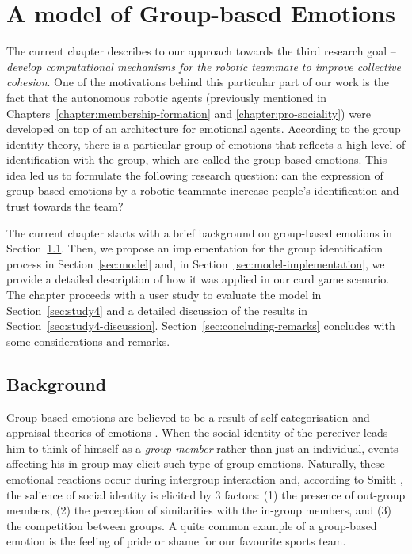 \chapter{A model of Group-based Emotions}
\label{chapter:group-based-emotions}


The current chapter describes to our approach towards the third research goal -- \textit{develop computational mechanisms for the robotic teammate to improve collective cohesion}. One of the motivations behind this particular part of our work is the fact that the autonomous robotic agents (previously mentioned in Chapters~\ref{chapter:membership-formation} and \ref{chapter:pro-sociality}) were developed on top of an architecture for emotional agents. According to the group identity theory, there is a particular group of emotions that reflects a high level of identification with the group, which are called the group-based emotions. This idea led us to formulate the following research question: can the expression of group-based emotions by a robotic teammate increase people's identification and trust towards the team?

The current chapter starts with a brief background on group-based emotions in Section~\ref{sec:backgroup}. Then, we propose an implementation for the group identification process in Section~\ref{sec:model} and, in Section~\ref{sec:model-implementation}, we provide a detailed description of how it was applied in our card game scenario. The chapter proceeds with a user study to evaluate the model in Section~\ref{sec:study4} and a detailed discussion of the results in Section~\ref{sec:study4-discussion}. Section~\ref{sec:concluding-remarks} concludes with some considerations and remarks.


\section{Background}
\label{sec:backgroup}
Group-based emotions are believed to be a result of self-ca\-te\-go\-ri\-sa\-tion and appraisal theories of emotions \cite{smith1993social}. When the social identity of the perceiver leads him to think of himself as a \textit{group member} rather than just an individual, events affecting his in-group may elicit such type of group emotions. Naturally, these emotional reactions occur during intergroup interaction and, according to Smith \cite{smith1993social}, the salience of social identity is elicited by 3 factors: (1) the presence of out-group members, (2) the perception of similarities with the in-group members, and (3) the competition between groups. A quite common example of a group-based emotion is the feeling of pride or shame for our favourite sports team.



